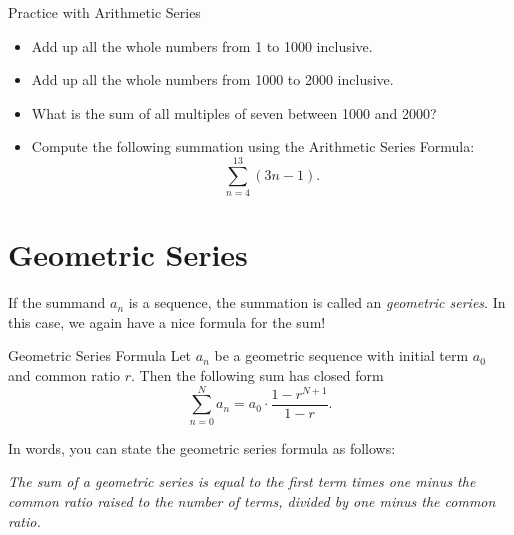 \begin{exercise}{Practice with Arithmetic Series \Coffeecup \Coffeecup}

\begin{itemize}

\item  Add up all the whole numbers from 1 to 1000 inclusive.

\vspace*{.6in}

\item Add up all the whole numbers from 1000 to 2000 inclusive.

\vspace*{.6in}

\item What is the sum of all multiples of seven between 1000 and 2000?

\vspace*{.6in}

\item Compute the following summation using the Arithmetic Series Formula: $$ \sum_{n=4}^{13} (3n-1).$$

\vspace*{.6in}

\end{itemize}


\end{exercise}

\section{Geometric Series} If the summand $a_n$ is a  sequence, the summation is called an \emph{geometric series}.  In this case, we again have a nice formula for the sum!  

\begin{theorem}{ Geometric Series Formula}  Let $a_n$ be a geometric sequence with initial term $a_0$ and common ratio $r$.  Then the following sum has closed form $$\sum_{n=0}^N a_n = a_0\cdot\frac{1-r^{N+1}}{1-r}. $$
\end{theorem}

In words, you can state the geometric series formula as follows:
\begin{center}\emph{The sum of a geometric series is equal to the first term times one minus the common ratio raised to the number of terms, divided by one minus the common ratio.}\end{center}

